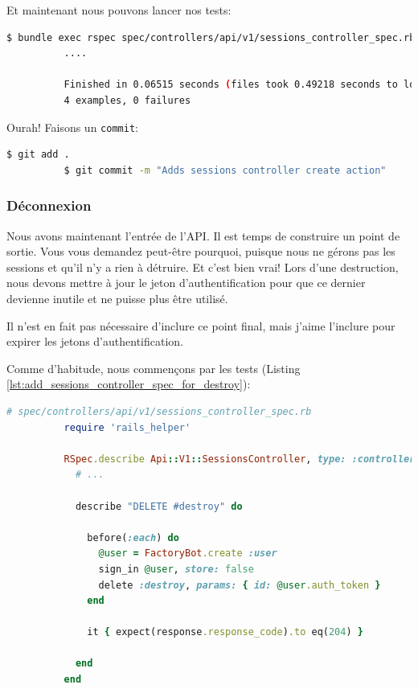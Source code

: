 \documentclass[]{report}
\begin{document}
        Et maintenant nous pouvons lancer nos tests:

        \begin{scriptsize}
          \begin{lstlisting}[language=bash]
          $ bundle exec rspec spec/controllers/api/v1/sessions_controller_spec.rb
          ....

          Finished in 0.06515 seconds (files took 0.49218 seconds to load)
          4 examples, 0 failures
          \end{lstlisting}
        \end{scriptsize}

        Ourah! Faisons un \verb|commit|:

        \begin{scriptsize}
          \begin{lstlisting}[language=bash]
          $ git add .
          $ git commit -m "Adds sessions controller create action"
          \end{lstlisting}
        \end{scriptsize}

      \subsubsection{Déconnexion}

        Nous avons maintenant l'entrée de l'API. Il est temps de construire un point de sortie. Vous vous demandez peut-être pourquoi, puisque nous ne gérons pas les sessions et qu'il n'y a rien à détruire. Et c'est bien vrai! Lors d'une destruction, nous devons mettre à jour le jeton d'authentification pour que ce dernier devienne inutile et ne puisse plus être utilisé.

        Il n'est en fait pas nécessaire d'inclure ce point final, mais j'aime l'inclure pour expirer les jetons d'authentification.

        Comme d'habitude, nous commençons par les tests (Listing \ref{lst:add_sessions_controller_spec_for_destroy}):

        \begin{scriptsize}
          \begin{lstlisting}[language=ruby, caption={Création des test de destruction des jetons d'authentification}, label={lst:add_sessions_controller_spec_for_destroy}]
          # spec/controllers/api/v1/sessions_controller_spec.rb
          require 'rails_helper'

          RSpec.describe Api::V1::SessionsController, type: :controller do
            # ...

            describe "DELETE #destroy" do

              before(:each) do
                @user = FactoryBot.create :user
                sign_in @user, store: false
                delete :destroy, params: { id: @user.auth_token }
              end

              it { expect(response.response_code).to eq(204) }

            end
          end
          \end{lstlisting}
        \end{scriptsize}
\end{document}
